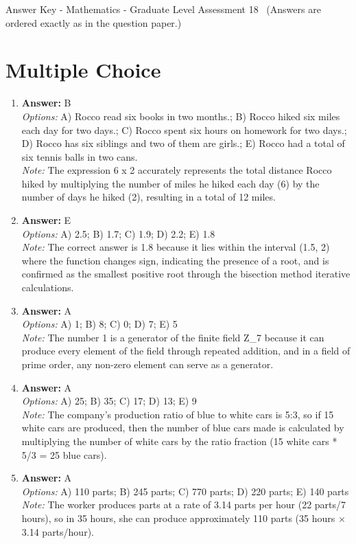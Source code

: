 \documentclass[12pt]{article}
\begin{document}
\begin{center}
Answer Key - Mathematics - Graduate Level Assessment 18 \
\small (Answers are ordered exactly as in the question paper.)
\end{center}

\section*{Multiple Choice}
\begin{enumerate}[label=\arabic*.]
\item \textbf{Answer:} B
\\ \textit{Options:} A) Rocco read six books in two months.; B) Rocco hiked six miles each day for two days.; C) Rocco spent six hours on homework for two days.; D) Rocco has six siblings and two of them are girls.; E) Rocco had a total of six tennis balls in two cans.
\\ \textit{Note:} The expression 6 x 2 accurately represents the total distance Rocco hiked by multiplying the number of miles he hiked each day (6) by the number of days he hiked (2), resulting in a total of 12 miles.
\item \textbf{Answer:} E
\\ \textit{Options:} A) 2.5; B) 1.7; C) 1.9; D) 2.2; E) 1.8
\\ \textit{Note:} The correct answer is 1.8 because it lies within the interval (1.5, 2) where the function changes sign, indicating the presence of a root, and is confirmed as the smallest positive root through the bisection method iterative calculations.
\item \textbf{Answer:} A
\\ \textit{Options:} A) 1; B) 8; C) 0; D) 7; E) 5
\\ \textit{Note:} The number 1 is a generator of the finite field Z\_7 because it can produce every element of the field through repeated addition, and in a field of prime order, any non-zero element can serve as a generator.
\item \textbf{Answer:} A
\\ \textit{Options:} A) 25; B) 35; C) 17; D) 13; E) 9
\\ \textit{Note:} The company's production ratio of blue to white cars is 5:3, so if 15 white cars are produced, then the number of blue cars made is calculated by multiplying the number of white cars by the ratio fraction (15 white cars * 5/3 = 25 blue cars).
\item \textbf{Answer:} A
\\ \textit{Options:} A) 110 parts; B) 245 parts; C) 770 parts; D) 220 parts; E) 140 parts
\\ \textit{Note:} The worker produces parts at a rate of 3.14 parts per hour (22 parts/7 hours), so in 35 hours, she can produce approximately 110 parts (35 hours × 3.14 parts/hour).
\end{enumerate}
\end{document}
